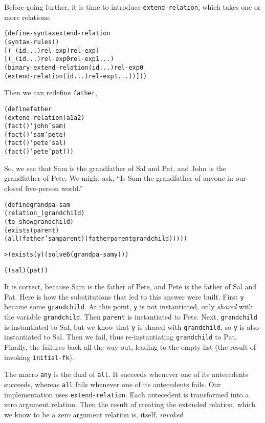 Before going further, it is time to introduce
\texttt{extend-relation}, which takes one or more relations.

\begin{alltt}
(define-syntax extend-relation
  (syntax-rules ()
    [(_ (id ...) rel-exp) rel-exp]
    [(_ (id ...) rel-exp0 rel-exp1 ...)
     (binary-extend-relation (id ...) rel-exp0
       (extend-relation (id ...) rel-exp1 ...))]))
\end{alltt}

\noindent
Then we can redefine \texttt{father},

\begin{alltt}
(define father
  (extend-relation (a1 a2)
    (fact () 'john 'sam)
    (fact () 'sam 'pete)
    (fact () 'pete 'sal)
    (fact () 'pete 'pat)))
\end{alltt}

So, we see that Sam is the grandfather of Sal and Pat, and John is the
grandfather of Pete.  We might ask, ``Is Sam the grandfather of anyone
in our closed five-person world.''

\begin{alltt}
(define grandpa-sam
  (relation _ (grandchild)
    (to-show grandchild)
    (exists (parent)
      (all (father 'sam parent) (father parent grandchild)))))
\end{alltt}

\begin{alltt}
> (exists (y) (solve 6 (grandpa-sam y)))

((sal) (pat))
\end{alltt}

It is correct, because Sam is the father of Pete, and
Pete is the father of Sal and Pat.  Here is
how the substitutions that led to this answer were built.  First
\texttt{y} became some \texttt{grandchild}.  At this point, \texttt{y}
is not instantiated, only \emph{shared} with the variable
\texttt{grandchild}.  Then \texttt{parent} is instantiated to
Pete.  Next, \texttt{grandchild} is instantiated to
Sal, but we know that \texttt{y} is shared with
\texttt{grandchild}, so \texttt{y} is also instantiated to
Sal.  Then we fail, thus re-instantiating \texttt{grandchild}
to Pat.  Finally, the failures back all the way out, leading
to the empty list (the result of invoking \texttt{initial-fk}).

The macro \texttt{any} is the dual of \texttt{all}.  It succeeds
whenever one of its antecedents succeeds, whereas \texttt{all} fails
whenever one of its antecedents fails.  Our implementation uses
\texttt{extend-relation}.  Each antecedent is transformed into a zero
argument relation.  Then the result of creating the extended relation,
which we know to be a zero argument relation is, itself,
\emph{invoked}.

